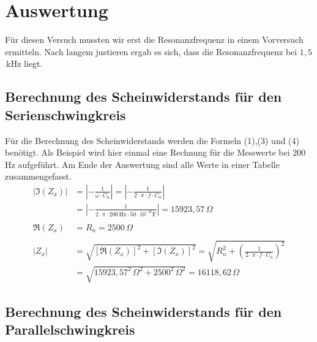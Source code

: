 \documentclass[fontsize=12pt]{scrartcl}
\begin{document}
\section{ Auswertung}

Für diesen Versuch mussten wir erst die Resonanzfrequenz in einem Vorversuch ermitteln. Nach langem justieren ergab es sich, dass die Resonanzfrequenz bei $1,5$\,kHz liegt.

\subsection{Berechnung des Scheinwiderstands für den Serienschwingkreis}

Für die Berechnung des Scheinwiderstands werden die Formeln (1),(3) und (4) benötigt. Als Beispiel wird hier einmal eine Rechnung für die Messwerte bei $200\,$Hz aufgeführt. Am Ende der Auswertung sind alle Werte in einer Tabelle zusammengefasst.
\begin{align*}
|\Im(Z_{x})|&= |- \frac{1}{\omega \cdot C_{n}}| = |- \frac{1}{2 \cdot \pi \cdot f \cdot C_{n}}| \\
&= |- \frac{1}{2 \cdot \pi \cdot 200\,\text{Hz} \cdot 50\cdot 10^{-9}\,\text{F}}| = 15923,57\,\Omega \\
~\\
\Re(Z_x) &= R_n = 2500\,\Omega \\
~\\
|Z_{x}|&= \sqrt{[\Re(Z_{x})]^2 +[\Im(Z_{x})]^2} = \sqrt{R_n^2 + (\frac{1}{2 \cdot \pi \cdot f \cdot C_{n}})^2} \\
&= \sqrt{15923,57^2\,\Omega^2 + 2500^2\,\Omega^2} = 16118,62\,\Omega
\end{align*}

\subsection{Berechnung des Scheinwiderstands für den Parallelschwingkreis}
\end{document}
